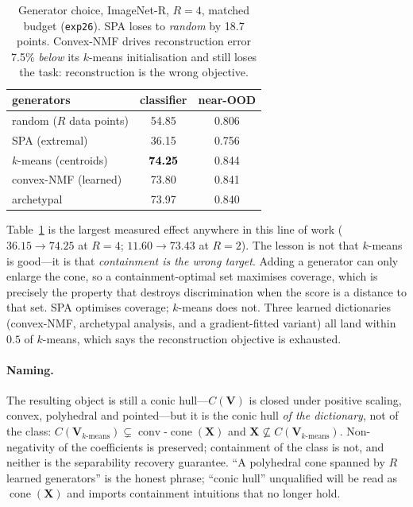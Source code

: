 \documentclass[10pt,twocolumn]{article}
\newcommand{\cone}{\operatorname{cone}}
\newcommand{\conv}{\operatorname{conv}}
\newcommand{\bV}{\mathbf{V}}
\newcommand{\bX}{\mathbf{X}}
\newcommand{\good}[1]{\textcolor{black}{\textbf{#1}}}
\begin{document}
\begin{table}[t]\centering\small
\begin{tabular}{lcc}
\toprule
generators & classifier & near-OOD \\
\midrule
random ($R$ data points) & 54.85 & 0.806 \\
SPA (extremal)           & 36.15 & 0.756 \\
$k$-means (centroids)    & \good{74.25} & 0.844 \\
convex-NMF (learned)     & 73.80 & 0.841 \\
archetypal               & 73.97 & 0.840 \\
\bottomrule
\end{tabular}
\caption{Generator choice, ImageNet-R, $R{=}4$, matched budget
(\texttt{exp26}). SPA loses to \emph{random} by 18.7 points. Convex-NMF drives
reconstruction error 7.5\% \emph{below} its $k$-means initialisation and still
loses the task: reconstruction is the wrong objective.}
\label{tab:gens}
\end{table}

Table~\ref{tab:gens} is the largest measured effect anywhere in this line of
work ($36.15\to74.25$ at $R{=}4$; $11.60\to73.43$ at $R{=}2$). The lesson is not
that $k$-means is good---it is that \emph{containment is the wrong target}.
Adding a generator can only enlarge the cone, so a containment-optimal set
maximises coverage, which is precisely the property that destroys discrimination
when the score is a distance to that set. SPA optimises coverage; $k$-means does
not. Three learned dictionaries (convex-NMF, archetypal analysis, and a
gradient-fitted variant) all land within $0.5$ of $k$-means, which says the
reconstruction objective is exhausted.

\paragraph{Naming.} The resulting object is still a conic hull---$C(\bV)$ is
closed under positive scaling, convex, polyhedral and pointed---but it is the
conic hull \emph{of the dictionary}, not of the class:
$C(\bV_{k\text{-means}})\subsetneq\conv\text{-}\cone(\bX)$ and
$\bX\not\subseteq C(\bV_{k\text{-means}})$. Non-negativity of the coefficients
is preserved; containment of the class is not, and neither is the separability
recovery guarantee. ``A polyhedral cone spanned by $R$ learned generators'' is
the honest phrase; ``conic hull'' unqualified will be read as $\cone(\bX)$ and
imports containment intuitions that no longer hold.
\end{document}
